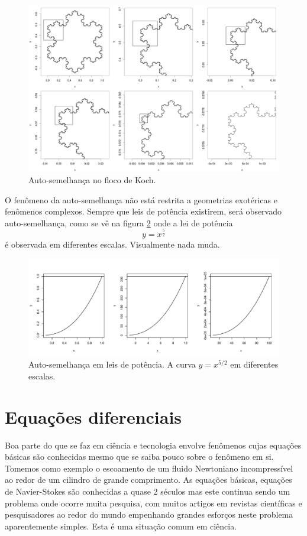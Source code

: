 \documentclass[article,12pt,oneside,a4paper,english,brazil,sumario=tradicional]{abntex2}
\begin{document}
\begin{figure}
\centering
\includegraphics[width=1\textwidth]{./figuras/koch-self.png}
\caption{Auto-semelhança no floco de Koch.}
\label{fig:koch-self}
\end{figure}


O fenômeno da auto-semelhança não está restrita a geometrias exotéricas e fenômenos complexos. Sempre que leis de potência existirem, será observado auto-semelhança, como se vê na figura \ref{fig:power-law} onde a lei de potência 
\[
y = x^\frac{5}{2}
\]
é observada em diferentes escalas. Visualmente nada muda.

\begin{figure}
\centering
\includegraphics[width=\textwidth]{./figuras/power.pdf}
\caption{Auto-semelhança em leis de potência. A curva $y = x^{5/2}$ em diferentes escalas.}
\label{fig:power-law}
\end{figure}


\section{Equações diferenciais}
Boa parte do que se faz em ciência e tecnologia envolve fenômenos cujas equações básicas são conhecidas mesmo que se saiba pouco sobre o fenômeno em si. Tomemos como exemplo o escoamento de um fluido Newtoniano incompressível ao redor de um cilindro de grande comprimento. As equações básicas, equações de Navier-Stokes são conhecidas a quase 2 séculos mas este continua sendo um problema onde ocorre muita pesquisa, com muitos artigos em revistas científicas e pesquisadores ao redor do mundo empenhando grandes esforços neste problema aparentemente simples. Esta é uma situação comum em ciência. 
\end{document}
